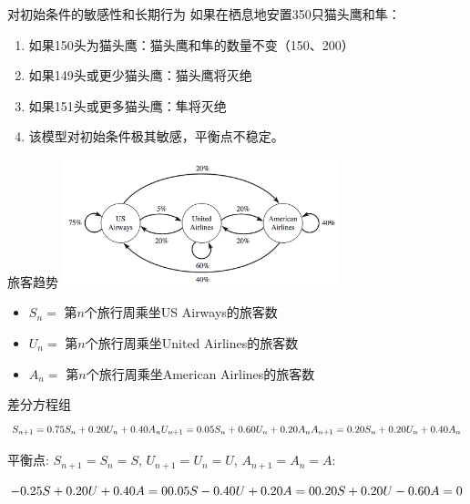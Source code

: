 \documentclass[
  ignorenonframetext,
]{ctexbeamer}
\providecommand{\tightlist}{%
  \setlength{\itemsep}{0pt}\setlength{\parskip}{0pt}}\usepackage{longtable,booktabs,array}
\begin{document}
\begin{frame}{对初始条件的敏感性和长期行为}
\label{ux5bf9ux521dux59cbux6761ux4ef6ux7684ux654fux611fux6027ux548cux957fux671fux884cux4e3a}
如果在栖息地安置350只猫头鹰和隼：

\begin{enumerate}
\tightlist
\item
  如果150头为猫头鹰：猫头鹰和隼的数量不变（150、200）
\item
  如果149头或更少猫头鹰：猫头鹰将灭绝
\item
  如果151头或更多猫头鹰：隼将灭绝
\item
  该模型对初始条件极其敏感，平衡点不稳定。
\end{enumerate}
\end{frame}

\begin{frame}{旅客趋势}
\label{ux65c5ux5ba2ux8d8bux52bf}
\includegraphics[width=0.6\textwidth,height=\textheight]{party.png}

\begin{itemize}
\tightlist
\item
  \(S_n =\) 第\(n\)个旅行周乘坐US Airways的旅客数
\item
  \(U_n =\) 第\(n\)个旅行周乘坐United Airlines的旅客数
\item
  \(A_n =\) 第\(n\)个旅行周乘坐American Airlines的旅客数
\end{itemize}
\end{frame}

\begin{frame}{差分方程组}
\label{ux5deeux5206ux65b9ux7a0bux7ec4-1}
\[
S_{n+1}=0.75S_n+0.20U_n+0.40A_n \\
U_{n+1}=0.05S_n+0.60U_n+0.20A_n \\
A_{n+1}=0.20S_n+0.20U_n+0.40A_n
\]

平衡点: \(S_{n+1}=S_n=S\), \(U_{n+1}=U_n=U\), \(A_{n+1}=A_n=A\):

\[
-0.25S+0.20U+0.40A=0 \\
0.05S-0.40U+0.20A=0 \\
0.20S+0.20U-0.60A=0
\]
\end{frame}
\end{document}
